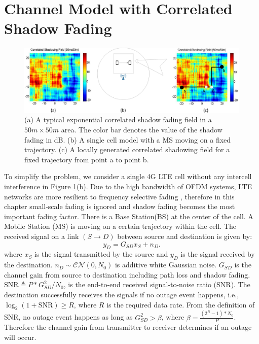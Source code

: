 \section{Channel Model with Correlated Shadow Fading}
\label{sec:shadowing}
\begin{figure}
\centering
\includegraphics[width=14cm]{finalsystemab_V3.eps}
\caption{(a) A typical exponential correlated shadow fading field in a $50m\times50m$ area. The color bar denotes the value of the shadow fading in dB. (b) A single cell model with a MS moving on a fixed trajectory. (c) A locally generated correlated shadowing field for a fixed trajectory from point a to point b.}
\label{systemmodel}
\end{figure}
To simplify the problem, we consider a single 4G LTE cell without any intercell interference in Figure \ref{systemmodel}(b). Due to the high bandwidth of OFDM systems,  LTE networks are more resilient to frequency selective fading \cite{rappaport1996wireless}, therefore in this chapter small-scale fading is ignored and shadow fading becomes the most important fading factor. There is a Base Station(BS) at the center of the cell. A Mobile Station (MS) is moving on a certain trajectory within the cell. The received signal on a link $(S\to D)$ between source and destination is given by:
\begin{equation}
y_{D} = G_{SD}x_{S}+n_{D}.
\end{equation}
where $x_{S}$ is the signal transmitted by the source and $y_{D}$ is the signal received by the destination. $n_{D}\sim \mathcal{CN}(0,N_{0})$ is additive white Gaussian noise. $G_{SD}$ is the channel gain from source to destination including path loss and shadow fading.  $\text{SNR} \triangleq P*G_{SD}^{2}/N_{0}$, is the end-to-end received signal-to-noise ratio (SNR). The destination successfully receives the signals if no outage event happens, i.e., $\log_{2}(1+\text{SNR})\ge R$, where $R$ is the required data rate. From the definition of SNR, no outage event happens as long as $G_{SD}^2 > \beta$, where $\beta = \frac{(2^{R}-1)*N_{0}}{P}$. Therefore the channel gain from transmitter to receiver determines if an outage will occur.
